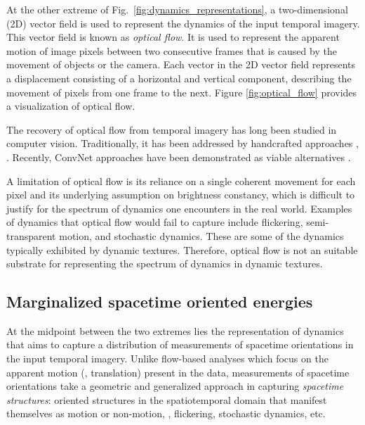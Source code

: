At the other extreme of Fig.\ \ref{fig:dynamics_representations}, a two-dimensional (2D) vector field is used to represent the dynamics of the input temporal imagery. This vector field is known as \emph{optical flow}. It is used to represent the apparent motion of image pixels between two consecutive frames that is caused by the movement of objects or the camera. Each vector in the 2D vector field represents a displacement consisting of a horizontal and vertical component, describing the movement of pixels from one frame to the next. Figure \ref{fig:optical_flow} provides a visualization of optical flow.

The recovery of optical flow from temporal imagery has long been studied in computer vision. Traditionally, it has been addressed by handcrafted approaches \eg, \cite{horn1981,lucas1981,revaud2015epicflow}. Recently, ConvNet approaches have been demonstrated as viable alternatives \cite{dosovitskiy2015,ilg2017,ranjan2017,yu2016}.

A limitation of optical flow is its reliance on a single coherent movement for each pixel and its underlying assumption on brightness constancy, which is difficult to justify for the spectrum of dynamics one encounters in the real world. Examples of dynamics that optical flow would fail to capture include flickering, semi-transparent motion, and stochastic dynamics. These are some of the dynamics typically exhibited by dynamic textures. Therefore, optical flow is not an suitable substrate for representing the spectrum of dynamics in dynamic textures.

\subsection{Marginalized spacetime oriented energies}
\label{sec:msoe}

At the midpoint between the two extremes lies the representation of dynamics that aims to capture a distribution of measurements of spacetime orientations in the input temporal imagery.
Unlike flow-based analyses which focus on the apparent motion (\ie, translation) present in the data, measurements of spacetime orientations take a geometric and generalized approach in capturing \emph{spacetime structures}: oriented structures in the spatiotemporal domain that manifest themselves as motion or non-motion, \eg, flickering, stochastic dynamics, etc.

